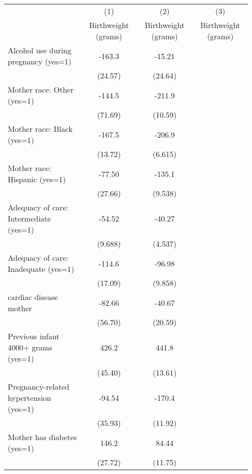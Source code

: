 \begin{tabular}{l*{3}{c}}
\hline\hline
                    &\multicolumn{1}{c}{(1)}&\multicolumn{1}{c}{(2)}&\multicolumn{1}{c}{(3)}\\
                    &\multicolumn{1}{c}{Birthweight (grams)}&\multicolumn{1}{c}{Birthweight (grams)}&\multicolumn{1}{c}{Birthweight (grams)}\\
\hline
Alcohol use during pregnancy (yes=1)&      -163.3&      -15.21&            \\
                    &     (24.57)&     (24.64)&            \\
[1em]
Mother race: Other (yes=1)&      -144.5&      -211.9&            \\
                    &     (71.69)&     (10.59)&            \\
[1em]
Mother race: Black (yes=1)&      -167.5&      -206.9&            \\
                    &     (13.72)&     (6.615)&            \\
[1em]
Mother race: Hispanic (yes=1)&      -77.50&      -135.1&            \\
                    &     (27.66)&     (9.538)&            \\
[1em]
Adequacy of care: Intermediate (yes=1)&      -54.52&      -40.27&            \\
                    &     (9.688)&     (4.537)&            \\
[1em]
Adequacy of care: Inadequate (yes=1)&      -114.6&      -96.98&            \\
                    &     (17.09)&     (9.858)&            \\
[1em]
cardiac disease mother&      -82.66&      -40.67&            \\
                    &     (56.70)&     (20.59)&            \\
[1em]
Previous infant 4000+ grams (yes=1)&       426.2&       441.8&            \\
                    &     (45.40)&     (13.61)&            \\
[1em]
Pregnancy-related hypertension (yes=1)&      -94.54&      -170.4&            \\
                    &     (35.93)&     (11.92)&            \\
[1em]
Mother has diabetes (yes=1)&       146.2&       84.44&            \\
                    &     (27.72)&     (11.75)&            \\

\end{tabular}
